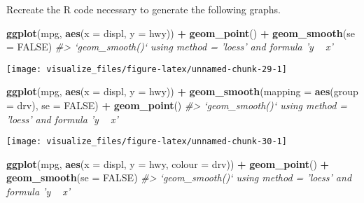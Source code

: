 \documentclass[]{book}
\newenvironment{Shaded}{\begin{snugshade}}{\end{snugshade}}
\newcommand{\CommentTok}[1]{\textcolor[rgb]{0.56,0.35,0.01}{\textit{#1}}}
\newcommand{\DataTypeTok}[1]{\textcolor[rgb]{0.13,0.29,0.53}{#1}}
\newcommand{\KeywordTok}[1]{\textcolor[rgb]{0.13,0.29,0.53}{\textbf{#1}}}
\newcommand{\NormalTok}[1]{#1}
\newcommand{\OperatorTok}[1]{\textcolor[rgb]{0.81,0.36,0.00}{\textbf{#1}}}
\newcommand{\OtherTok}[1]{\textcolor[rgb]{0.56,0.35,0.01}{#1}}
\newcommand{\StringTok}[1]{\textcolor[rgb]{0.31,0.60,0.02}{#1}}
\theoremstyle{plain}
\theoremstyle{remark}
\begin{document}
Recreate the R code necessary to generate the following graphs.

\begin{Shaded}
\begin{Highlighting}[]
\KeywordTok{ggplot}\NormalTok{(mpg, }\KeywordTok{aes}\NormalTok{(}\DataTypeTok{x =}\NormalTok{ displ, }\DataTypeTok{y =}\NormalTok{ hwy)) }\OperatorTok{+}
\StringTok{  }\KeywordTok{geom_point}\NormalTok{() }\OperatorTok{+}
\StringTok{  }\KeywordTok{geom_smooth}\NormalTok{(}\DataTypeTok{se =} \OtherTok{FALSE}\NormalTok{)}
\CommentTok{#> `geom_smooth()` using method = 'loess' and formula 'y ~ x'}
\end{Highlighting}
\end{Shaded}

\begin{center}\texttt{[image: visualize\_files/figure-latex/unnamed-chunk-29-1]} \end{center}

\begin{Shaded}
\begin{Highlighting}[]
\KeywordTok{ggplot}\NormalTok{(mpg, }\KeywordTok{aes}\NormalTok{(}\DataTypeTok{x =}\NormalTok{ displ, }\DataTypeTok{y =}\NormalTok{ hwy)) }\OperatorTok{+}
\StringTok{  }\KeywordTok{geom_smooth}\NormalTok{(}\DataTypeTok{mapping =} \KeywordTok{aes}\NormalTok{(}\DataTypeTok{group =}\NormalTok{ drv), }\DataTypeTok{se =} \OtherTok{FALSE}\NormalTok{) }\OperatorTok{+}
\StringTok{  }\KeywordTok{geom_point}\NormalTok{()}
\CommentTok{#> `geom_smooth()` using method = 'loess' and formula 'y ~ x'}
\end{Highlighting}
\end{Shaded}

\begin{center}\texttt{[image: visualize\_files/figure-latex/unnamed-chunk-30-1]} \end{center}

\begin{Shaded}
\begin{Highlighting}[]
\KeywordTok{ggplot}\NormalTok{(mpg, }\KeywordTok{aes}\NormalTok{(}\DataTypeTok{x =}\NormalTok{ displ, }\DataTypeTok{y =}\NormalTok{ hwy, }\DataTypeTok{colour =}\NormalTok{ drv)) }\OperatorTok{+}
\StringTok{  }\KeywordTok{geom_point}\NormalTok{() }\OperatorTok{+}
\StringTok{  }\KeywordTok{geom_smooth}\NormalTok{(}\DataTypeTok{se =} \OtherTok{FALSE}\NormalTok{)}
\CommentTok{#> `geom_smooth()` using method = 'loess' and formula 'y ~ x'}
\end{Highlighting}
\end{Shaded}
\end{document}
